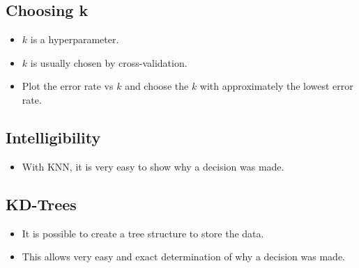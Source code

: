 \documentclass[12pt]{article}
\begin{document}
        \subsection{Choosing k}
            \begin{itemize}
                \item $k$ is a hyperparameter.
                \item $k$ is usually chosen by cross-validation.
                \item Plot the error rate vs $k$ and choose the $k$ with approximately the lowest error rate.
            \end{itemize}
        \subsection{Intelligibility}
            \begin{itemize}
                \item With KNN, it is very easy to show why a decision was made.
            \end{itemize}
        \subsection{KD-Trees}
            \begin{itemize}
                \item It is possible to create a tree structure to store the data.
                \item This allows very easy and exact determination of why a decision was made.
            \end{itemize}
\end{document}
